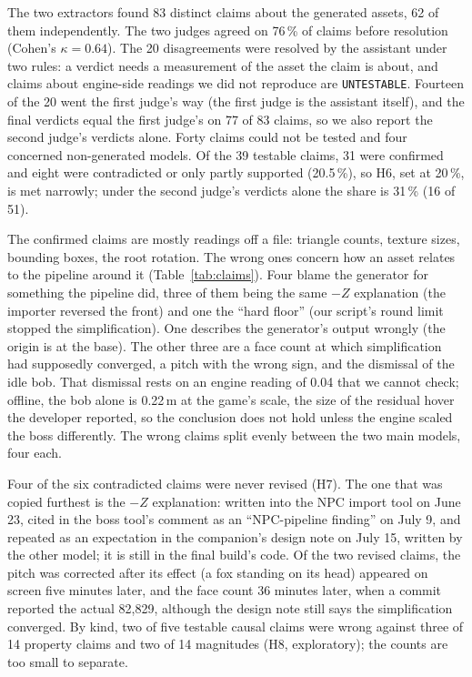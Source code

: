 The two extractors found 83 distinct claims about the generated assets, 62 of
them independently. The two judges agreed on 76\,\% of claims before resolution
(Cohen's $\kappa = 0.64$). The 20 disagreements were resolved by the assistant
under two rules: a verdict needs a measurement of the asset the claim is about,
and claims about engine-side readings we did not reproduce are
\texttt{UNTESTABLE}. Fourteen of the 20 went the first judge's way (the first
judge is the assistant itself), and the final verdicts equal the first judge's on
77 of 83 claims, so we also report the second judge's verdicts alone. Forty claims
could not be tested and four concerned non-generated models. Of the 39 testable
claims, 31 were confirmed and eight were contradicted or only partly supported
(20.5\,\%), so H6, set at 20\,\%, is met narrowly; under the second judge's
verdicts alone the share is 31\,\% (16 of 51).

The confirmed claims are mostly readings off a file: triangle counts, texture
sizes, bounding boxes, the root rotation. The wrong ones concern how an asset
relates to the pipeline around it (Table~\ref{tab:claims}). Four blame the
generator for something the pipeline did, three of them being the same $-Z$
explanation (the importer reversed the front) and one the ``hard floor'' (our
script's round limit stopped the simplification). One describes the generator's
output wrongly (the origin is at the base). The other three are a face count at
which simplification had supposedly converged, a pitch with the wrong sign, and
the dismissal of the idle bob. That dismissal rests on an engine reading of
0.04 that we cannot check; offline, the bob alone is 0.22\,m at the game's scale,
the size of the residual hover the developer reported, so the conclusion does not
hold unless the engine scaled the boss differently. The wrong claims split evenly
between the two main models, four each.

Four of the six contradicted claims were never revised (H7). The one that was
copied furthest is the $-Z$ explanation: written into the NPC import tool on
June 23, cited in the boss tool's comment as an ``NPC-pipeline finding'' on
July 9, and repeated as an expectation in the companion's design note on July 15,
written by the other model; it is still in the final build's code.
Of the two revised claims, the pitch was corrected after its effect (a fox
standing on its head) appeared on screen five minutes later, and the face count
36 minutes later, when a commit reported the actual 82,829, although the design
note still says the simplification converged. By kind, two of five testable
causal claims were wrong against three of 14 property claims and two of 14
magnitudes (H8, exploratory); the counts are too small to separate.

